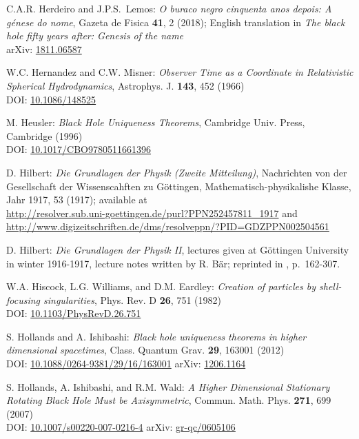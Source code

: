 \begin{thebibliography}{123}
C.A.R. Herdeiro and J.P.S.~Lemos:
\emph{O buraco negro cinquenta anos depois:
A génese do nome},
Gazeta de Fisica {\bf 41}, 2 (2018); English translation in
\emph{The black hole fifty years after: Genesis of the name}\\
arXiv: \href{https://arxiv.org/abs/1811.06587}{1811.06587}

W.C. Hernandez and C.W. Misner:
{\em Observer Time as a Coordinate in Relativistic Spherical Hydrodynamics},
Astrophys. J. {\bf 143}, 452 (1966) \\
DOI: \href{https://doi.org/10.1086/148525}{10.1086/148525}

M. Heusler:
{\em Black Hole Uniqueness Theorems},
Cambridge Univ. Press, Cambridge (1996) \\
DOI: \href{https://doi.org/10.1017/CBO9780511661396}{10.1017/CBO9780511661396}

D. Hilbert:
{\em Die Grundlagen der Physik (Zweite Mitteilung)},
Nachrichten von der Gesellschaft der Wissenscahften zu Göttingen,
Mathematisch-physikalishe Klasse, Jahr 1917, 53 (1917);
available at\\
\url{http://resolver.sub.uni-goettingen.de/purl?PPN252457811_1917} and\\
\url{http://www.digizeitschriften.de/dms/resolveppn/?PID=GDZPPN002504561}

D. Hilbert:
{\em Die Grundlagen der Physik II},
lectures given at Göttingen University in winter 1916-1917,
lecture notes written by R. Bär; reprinted
in \cite{SauerM09}, p.~162-307.

W.A. Hiscock, L.G. Williams, and D.M. Eardley:
{\em Creation of particles by shell-focusing singularities},
Phys. Rev. D {\bf 26}, 751 (1982)\\
DOI: \href{https://doi.org/10.1103/PhysRevD.26.751}{10.1103/PhysRevD.26.751}

S. Hollands and A. Ishibashi:
{\em Black hole uniqueness theorems in higher dimensional spacetimes},
Class. Quantum Grav. {\bf 29}, 163001 (2012)\\
DOI: \href{https://doi.org/10.1088/0264-9381/29/16/163001}{10.1088/0264-9381/29/16/163001}\hfill
arXiv: \href{https://arxiv.org/abs/1206.1164}{1206.1164}

S. Hollands, A. Ishibashi, and R.M. Wald:
{\em A Higher Dimensional Stationary Rotating Black Hole Must be Axisymmetric},
Commun. Math. Phys. {\bf 271}, 699 (2007)\\
DOI: \href{https://doi.org/10.1007/s00220-007-0216-4}{10.1007/s00220-007-0216-4}\hfill
arXiv: \href{https://arxiv.org/abs/gr-qc/0605106}{gr-qc/0605106}


\end{thebibliography}
